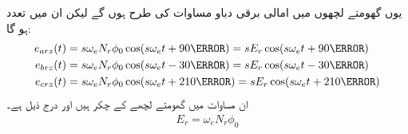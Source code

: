یوں گھومتے لچھوں میں امالی برقی دباو مساوات   کی طرح  ہوں گے لیکن  ان میں تعدد  ہو گا:
\begin{gather}
\begin{aligned}\label{مساوات_امالی_گھومتا_حصہ_تین_دور_سائن_نما_برقی_دباو}
e_{arz}(t)&=s \omega_e N_r \phi_0 \cos (s \omega_e t +90\degree)=s E_r \cos (s \omega_e t +90\degree)\\
e_{brz}(t)&=s \omega_e N_r \phi_0 \cos (s \omega_e t -30\degree)= s E_r \cos (s \omega_e t -30\degree)\\
e_{crz}(t)&=s \omega_e N_r \phi_0 \cos (s \omega_e t +210\degree)= s E_r \cos (s \omega_e t +210\degree)
\end{aligned}
\end{gather}
ان مساوات میں   گھومتے لچھے کے چکر ہیں اور  درج ذیل ہے۔
\begin{align}
E_r=\omega_e N_r \phi_0
\end{align}

